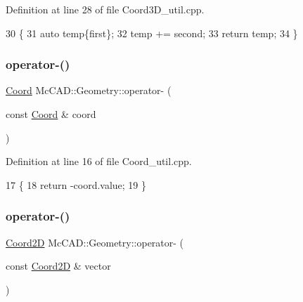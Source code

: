 Definition at line 28 of file Coord3\+D\+\_\+util.\+cpp.


\begin{DoxyCode}
30                               \{
31     \textcolor{keyword}{auto} temp\{first\};
32     temp += second;
33     \textcolor{keywordflow}{return} temp;
34 \}
\end{DoxyCode}
\mbox{\label{namespaceMcCAD_1_1Geometry_a0936188f672a7cfe51aaefc674e3ab5f}} 
\subsubsection{\texorpdfstring{operator-\/()}{operator-()}\hspace{0.1cm}{\footnotesize\ttfamily [1/6]}}
{\footnotesize\ttfamily \hyperlink{classMcCAD_1_1Geometry_1_1Coord}{Coord} Mc\+C\+A\+D\+::\+Geometry\+::operator-\/ (\begin{DoxyParamCaption}\item[{const \hyperlink{classMcCAD_1_1Geometry_1_1Coord}{Coord} \&}]{coord }\end{DoxyParamCaption})}



Definition at line 16 of file Coord\+\_\+util.\+cpp.


\begin{DoxyCode}
17                            \{
18     \textcolor{keywordflow}{return} -coord.value;
19 \}
\end{DoxyCode}
\mbox{\label{namespaceMcCAD_1_1Geometry_abf685bcca6c6c30474088f9265881d54}} 
\subsubsection{\texorpdfstring{operator-\/()}{operator-()}\hspace{0.1cm}{\footnotesize\ttfamily [2/6]}}
{\footnotesize\ttfamily \hyperlink{classMcCAD_1_1Geometry_1_1Coord2D}{Coord2D} Mc\+C\+A\+D\+::\+Geometry\+::operator-\/ (\begin{DoxyParamCaption}\item[{const \hyperlink{classMcCAD_1_1Geometry_1_1Coord2D}{Coord2D} \&}]{vector }\end{DoxyParamCaption})}



